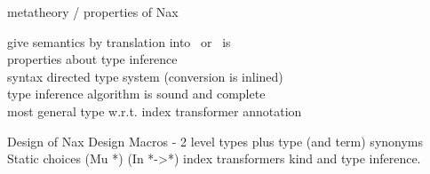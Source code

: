 metatheory / properties of Nax

give semantics by translation into \Fi\ or \Fixw\ is \\

properties about type inference \\
syntax directed type system (conversion is inlined) \\
type inference algorithm is sound and complete \\
most general type w.r.t. index transformer annotation

Design of Nax
    Design Macros - 2 level types plus type (and term) synonyms
    Static choices (Mu *)  (In *->*)   index transformers
    kind and type inference.

